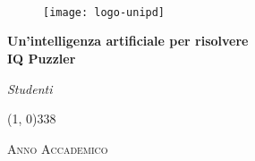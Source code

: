 
\begin{titlepage}

\begin{center}

\begin{LARGE}
\textbf{\myUni}\\
\end{LARGE}

\vspace{10pt}

\begin{Large}
\textsc{\myDepartment}\\
\end{Large}

\vspace{10pt}

\begin{large}
\textsc{\myFaculty}\\
\end{large}

\vspace{30pt}
\begin{figure}[htbp]
\begin{center}
\texttt{[image: logo-unipd]}
\end{center}
\end{figure}
\vspace{30pt} 

\begin{LARGE}
\begin{center}
\textbf{Un'intelligenza artificiale per risolvere \\IQ Puzzler}\\
\end{center}
\end{LARGE}

\vspace{40pt} 

\begin{Large}
\begin{center}
\textit{Studenti}\\ 
\vspace{10pt} 
\myName
\end{center}
\end{Large}

\vspace{40pt}

\line(1, 0){338}
\begin{normalsize}
\textsc{Anno Accademico \myAA}
\end{normalsize}

\end{center}
\end{titlepage} 